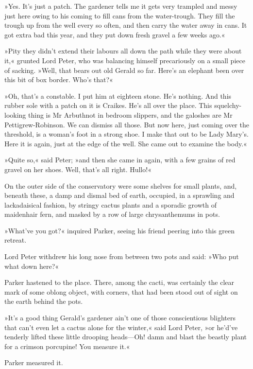 »Yes. It's just a patch. The gardener tells me it gets very trampled and messy just here owing to his coming to fill cans from the water-trough. They fill the trough up from the well every so often, and then carry the water away in cans. It got extra bad this year, and they put down fresh gravel a few weeks ago.«

»Pity they didn't extend their labours all down the path while they were about it,« grunted Lord Peter, who was balancing himself precariously on a small piece of sacking. »Well, that bears out old Gerald so far. Here's an elephant been over this bit of box border. Who's that?«

»Oh, that's a constable. I put him at eighteen stone. He's nothing. And this rubber sole with a patch on it is Craikes. He's all over the place. This squelchy-looking thing is Mr Arbuthnot in bedroom slippers, and the galoshes are Mr Pettigrew-Robinson. We can dismiss all those. But now here, just coming over the threshold, is a woman's foot in a strong shoe. I make that out to be Lady Mary's. Here it is again, just at the edge of the well. She came out to examine the body.«

»Quite so,« said Peter; »and then she came in again, with a few grains of red gravel on her shoes. Well, that's all right. Hullo!«

On the outer side of the conservatory were some shelves for small plants, and, beneath these, a damp and dismal bed of earth, occupied, in a sprawling and lackadaisical fashion, by stringy cactus plants and a sporadic growth of maidenhair fern, and masked by a row of large chrysanthemums in pots.

»What've you got?« inquired Parker, seeing his friend peering into this green retreat.

Lord Peter withdrew his long nose from between two pots and said: »Who put what down here?«

Parker hastened to the place. There, among the cacti, was certainly the clear mark of some oblong object, with corners, that had been stood out of sight on the earth behind the pots.

»It's a good thing Gerald's gardener ain't one of those conscientious blighters that can't even let a cactus alone for the winter,« said Lord Peter, »or he'd've tenderly lifted these little drooping heads\allowbreak---\allowbreak Oh! damn and blast the beastly plant for a crimson porcupine! You measure it.«

Parker measured it.

